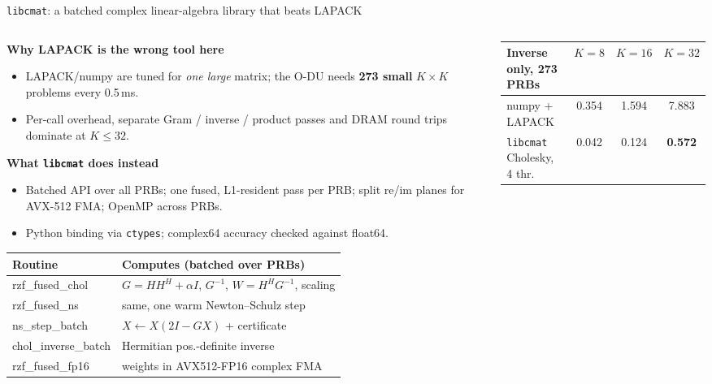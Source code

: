 \documentclass[aspectratio=169,10pt,xcolor={table,dvipsnames}]{beamer}
\newcommand{\ours}{\rowcolor{good!14}}
\begin{document}
\begin{frame}{\texttt{libcmat}: a batched complex linear-algebra library that beats LAPACK}
\begin{columns}[T]
\begin{column}{0.5\textwidth}
\footnotesize
\textbf{\small Why LAPACK is the wrong tool here}
\begin{itemize}
  \item LAPACK/numpy are tuned for \emph{one large} matrix; the O-DU needs \textbf{273 small} $K{\times}K$ problems every 0.5\,ms.
  \item Per-call overhead, separate Gram / inverse / product passes and DRAM round trips dominate at $K \le 32$.
\end{itemize}
\textbf{\small What \texttt{libcmat} does instead}
\begin{itemize}
  \item Batched API over all PRBs; one fused, L1-resident pass per PRB; split re/im planes for AVX-512 FMA; OpenMP across PRBs.
  \item Python binding via \texttt{ctypes}; complex64 accuracy checked against float64.
\end{itemize}
\vspace{0.2em}
\scriptsize
\setlength{\tabcolsep}{3pt}
\tiny
\begin{tabular}{>{\ttfamily}l l}
\toprule
\normalfont Routine & Computes (batched over PRBs) \\
\midrule
rzf\_fused\_chol & $G{=}HH^H{+}\alpha I$, $G^{-1}$, $W{=}H^H G^{-1}$, scaling \\
rzf\_fused\_ns & same, one warm Newton--Schulz step \\
ns\_step\_batch & $X \leftarrow X(2I{-}GX)$ + certificate \\
chol\_inverse\_batch & Hermitian pos.-definite inverse \\
rzf\_fused\_fp16 & weights in AVX512-FP16 complex FMA \\
\bottomrule
\end{tabular}
\end{column}
\begin{column}{0.48\textwidth}
\centering
\scriptsize
\setlength{\tabcolsep}{3pt}
\begin{tabular}{lccc}
\toprule
Inverse only, 273 PRBs & $K{=}8$ & $K{=}16$ & $K{=}32$ \\
\midrule
numpy + LAPACK & 0.354 & 1.594 & 7.883 \\
\ours \texttt{libcmat} Cholesky, 4 thr. & 0.042 & 0.124 & \textbf{0.572} \\

\end{tabular}
\end{column}
\end{columns}
\end{frame}
\end{document}
